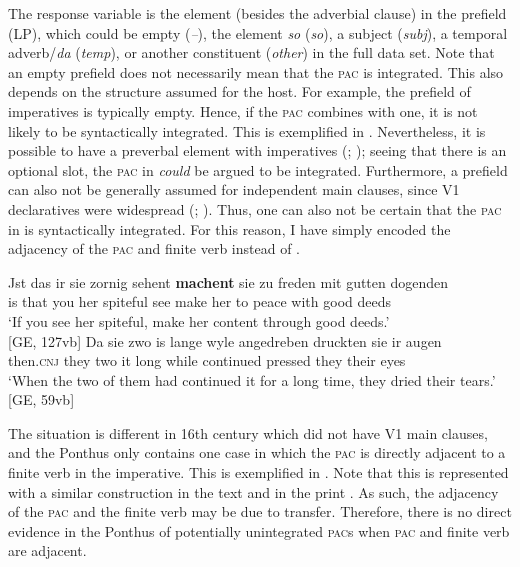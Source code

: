 \documentclass[output=paper,colorlinks,citecolor=brown]{langscibook}
\begin{document}
The response variable is the element (besides the adverbial clause) in the prefield (\textsc{LP}), which could be empty (\textit{--}), the element \textit{so} (\textit{so}), a subject (\textit{subj}), a temporal adverb/\textit{da} (\textit{temp}), or another constituent (\textit{other}) in the full data set. Note that an empty prefield does not necessarily mean that the \textsc{pac} is integrated. This also depends on the structure assumed for the host. For example, the prefield of imperatives is typically empty. Hence, if the \textsc{pac} combines with one, it is not likely to be syntactically integrated. This is exemplified in . Nevertheless, it is possible to have a preverbal element with imperatives (\citealt[e.g.,][432]{Ebert1993}; \citealt[1450]{Muller2014}); seeing that there is an optional slot, the \textsc{pac} in  \textit{could} be argued to be integrated. Furthermore, a prefield can also not be generally assumed for  independent main clauses, since V1 declaratives were widespread (\citealt[431f.]{Ebert1993}; \citealt[145]{Demske2018}). Thus, one can also not be certain that the \textsc{pac} in  is syntactically integrated. For this reason, I have simply encoded the adjacency of the \textsc{pac} and finite verb instead of .

\ea
\ea \label{ex:IMP}
 \gll Jst das ir sie zornig sehent \textbf{machent} sie zu freden mit gutten dogenden \\
is that you her spiteful see make her to peace with good deeds\\
\glt `If you see her spiteful, make her content through good deeds.'\\ \hfill [GE, 127vb]
\ex \label{ex:V1?}
\gll Da sie zwo is lange wyle angedreben druckten sie ir augen\\
then.\textsc{cnj} they two it long while continued pressed they their eyes\\
\glt `When the two of them had continued it for a long time, they dried their tears.' \hfill [GE, 59vb]
\z
\z

The situation is different in 16th century  which did not have V1 main clauses, and the Ponthus only contains one case in which the \textsc{pac} is directly adjacent to a finite verb in the imperative. This is exemplified in . Note that this is represented with a similar construction in the  text  and in the  print . As such, the adjacency of the \textsc{pac} and the finite verb may be due to transfer. Therefore, there is no direct evidence in the  Ponthus of potentially unintegrated \textsc{pac}s when \textsc{pac} and finite verb are adjacent.
\end{document}
